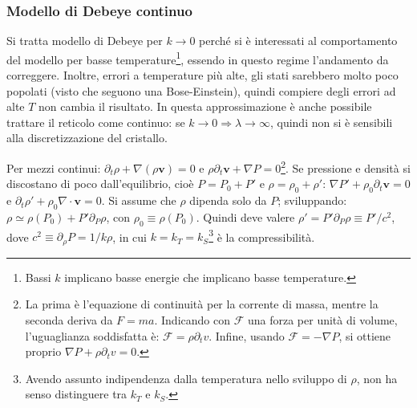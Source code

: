 \documentclass[10pt, a4paper]{scrartcl}
\numberwithin{equation}{subsection}
\theoremstyle{style1}
\begin{document}
\subsubsection{Modello di Debeye continuo}

Si tratta modello di Debeye per $k\to 0$ perch\'e si \`e interessati al comportamento del modello per basse temperature\footnote{Bassi $k$ implicano basse energie che implicano basse temperature.}, essendo in questo regime l'andamento da correggere. 
Inoltre, errori a temperature pi\`u alte, gli stati sarebbero molto poco popolati (visto che seguono una Bose-Einstein), quindi compiere degli errori ad alte $T$ non cambia il risultato.
In questa approssimazione \`e anche possibile trattare il reticolo come continuo: se $k\to 0 \Rightarrow  \lambda \to \infty$, quindi non si \`e sensibili alla discretizzazione del cristallo.

Per mezzi continui: $\partial _t \rho  + \nabla (\rho  \mathbf{v} ) = 0$ e $\rho  \partial _t \mathbf{ v}  + \nabla P = 0$\footnote{La prima \`e l'equazione di continuit\`a per la corrente di massa, mentre la seconda deriva da $F=ma$. Indicando con $\mathcal{F}$ una forza per unit\`a di volume, l'uguaglianza soddisfatta \`e: $\mathcal{F} = \rho \partial _t v$. Infine, usando $\mathcal{F}=-\nabla P$, si ottiene proprio $\nabla P +\rho \partial _t v = 0$.}.
Se pressione e densit\`a si discostano di poco dall'equilibrio, cio\`e $P = P_0 + P'$ e $\rho  = \rho _0 + \rho '$: $\nabla P' + \rho _0 \partial _t \mathbf{v} = 0$ e $\partial _t \rho ' + \rho _0 \nabla \cdot \mathbf{v} =0$.
Si assume che $\rho $ dipenda solo da $P$; sviluppando: $\rho \simeq \rho (P_0) + P'\partial _P \rho $, con $\rho _0 \equiv \rho (P_0)$. Quindi deve valere $\rho ' = P'\partial _P \rho  \equiv P ' / c^2$, dove $c^2 \equiv \partial _\rho P = 1 / k\rho $, in cui $k = k_T = k_S$\footnote{Avendo assunto indipendenza dalla temperatura nello sviluppo di $\rho $, non ha senso distinguere tra $k _T$ e $k_S$.} \`e la compressibilit\`a.
\end{document}

